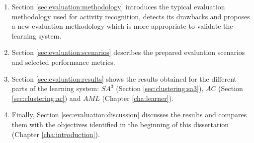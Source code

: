 \begin{enumerate}
 \item Section \ref{sec:evaluation:methodology} introduces the typical evaluation methodology used for activity recognition, detects its drawbacks and proposes a new evaluation methodology which is more appropriate to validate the learning system. %
 \item Section \ref{sec:evaluation:scenarios} describes the prepared evaluation scenarios and selected performance metrics. %
 \item Section \ref{sec:evaluation:results} shows the results obtained for the different parts of the learning system: $SA^3$ (Section \ref{sec:clustering:sa3}), $AC$ (Section \ref{sec:clustering:ac}) and $AML$ (Chapter \ref{cha:learner}). %
 \item Finally, Section \ref{sec:evaluation:discussion} discusses the results and compares them with the objectives identified in the beginning of this dissertation (Chapter \ref{cha:introduction}). %
\end{enumerate}
